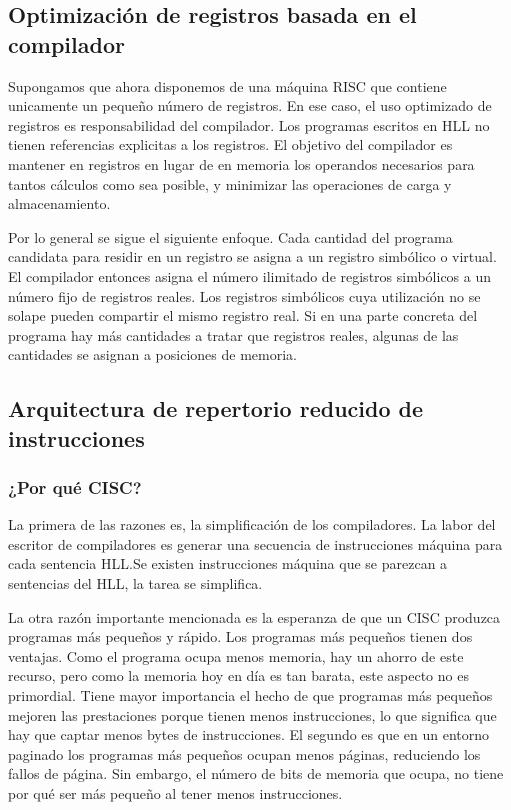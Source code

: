 \subsection{Optimización de registros basada en el compilador}

Supongamos que ahora disponemos de una máquina RISC que contiene unicamente un pequeño número de registros. En ese caso, el uso optimizado de registros es responsabilidad del compilador. Los programas escritos en HLL no tienen referencias explicitas a los registros. El objetivo del compilador es mantener en registros en lugar de en memoria los operandos necesarios para tantos cálculos como sea posible, y minimizar las operaciones de carga y almacenamiento.

Por lo general se sigue el siguiente enfoque. Cada cantidad del programa candidata para residir en un registro se asigna a un registro simbólico o virtual. El compilador entonces asigna el número ilimitado de registros simbólicos a un número fijo de registros reales. Los registros simbólicos cuya utilización no se solape pueden compartir el mismo registro real. Si en una parte concreta del programa hay más cantidades a tratar que registros reales, algunas de las cantidades se asignan a posiciones de memoria.

\subsection{Arquitectura de repertorio reducido de instrucciones}

\subsubsection*{¿Por qué CISC?}

La primera de las razones es, la simplificación de los compiladores. La labor del escritor de compiladores es generar una secuencia de instrucciones máquina para cada sentencia HLL.\@ Se existen instrucciones máquina que se parezcan a sentencias del HLL, la tarea se simplifica.

La otra razón importante mencionada es la esperanza de que un CISC produzca programas más pequeños y rápido. Los programas más pequeños tienen dos ventajas. Como el programa ocupa menos memoria, hay un ahorro de este recurso, pero como la memoria hoy en día es tan barata, este aspecto no es primordial. Tiene mayor importancia el hecho de que programas más pequeños mejoren las prestaciones porque tienen menos instrucciones, lo que significa que hay que captar menos bytes de instrucciones. El segundo es que en un entorno paginado los programas más pequeños ocupan menos páginas, reduciendo los fallos de página. Sin embargo, el número de bits de memoria que ocupa, no tiene por qué ser más pequeño al tener menos instrucciones.

